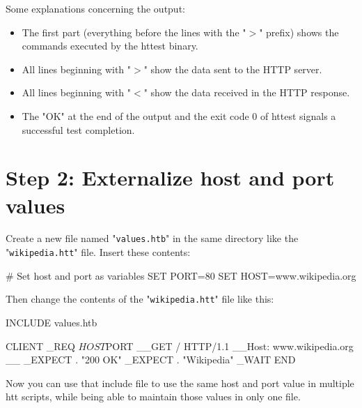 Some explanations concerning the output:

\begin{itemize}
\item The first part (everything before the lines with the "$>$" prefix)
      shows the commands executed by the httest binary.
\item All lines beginning with "$>$" show the data sent to the HTTP server.
\item All lines beginning with "$<$" show the data received in the HTTP response.
\item The "OK" at the end of the output and the exit code 0 of httest signals a successful test completion.
\end{itemize}

\newpage
\section{Step 2: Externalize host and port values} 

Create a new file named "\texttt{values.htb}" in the same directory like the 
"\texttt{wikipedia.htt}" file. Insert these contents:

\begin{usplisting}
    # Set host and port as variables
    SET PORT=80
    SET HOST=www.wikipedia.org
\end{usplisting}

Then change the contents of the "\texttt{wikipedia.htt}" file like this:

\begin{usplisting}
    INCLUDE values.htb
    
    CLIENT
    _REQ $HOST $PORT
    __GET / HTTP/1.1
    __Host: www.wikipedia.org
    __
    _EXPECT . "200 OK"
    _EXPECT . "Wikipedia"
    _WAIT
    END
\end{usplisting}

Now you can use that include file to use the same host and port value 
in multiple htt scripts, while being able to maintain those values in 
only one file.

